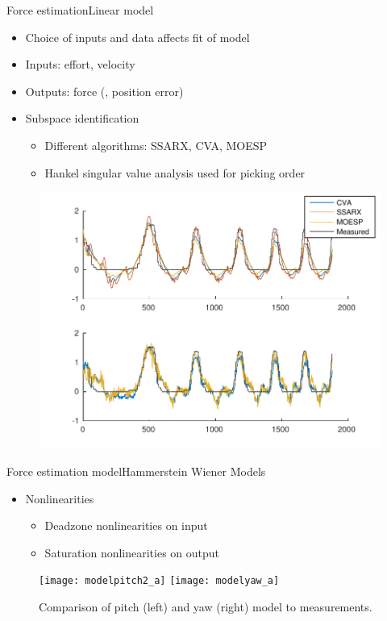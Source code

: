 \begin{frame}{Force estimation}{Linear model}
\begin{itemize}
  \item Choice of inputs and data affects fit of model
  \item Inputs: effort, velocity 
  \item Outputs: force (, position error)
  \item Subspace identification
	\begin{itemize}
	\item Different algorithms: SSARX, CVA, MOESP
	\item Hankel singular value analysis used for picking order
	\end{itemize}
\end{itemize}
	
	\begin{figure}
	\centering
	\includegraphics[width=\linewidth]{Billeder/sscomparison1-eps-converted-to.pdf}
	\end{figure}
\end{frame}

\begin{frame}

\end{frame}


\begin{frame}{Force estimation model}{Hammerstein Wiener Models}
\begin{itemize}
  \item Nonlinearities
  \begin{itemize}
    \item Deadzone nonlinearities on input 
    \item Saturation nonlinearities on output
  \end{itemize}
\end{itemize}


 \begin{figure}[h]
 \centering
 \texttt{[image: modelpitch2\_a]}
 \texttt{[image: modelyaw\_a]}
 \caption{Comparison of pitch (left) and yaw (right) model to measurements.}
 \label{fig:final_res_yaw}
 \end{figure}
\end{frame}

